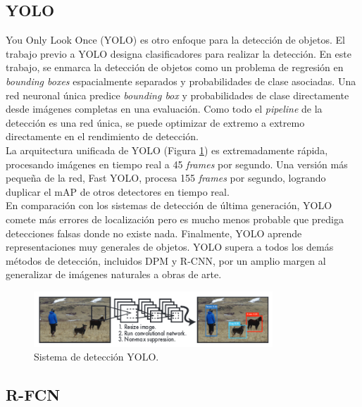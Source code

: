 \documentclass{bmvc2k}
\begin{document}
\subsection{YOLO}

You Only Look Once (YOLO) es otro enfoque para la detección de objetos. El trabajo previo a YOLO designa clasificadores para realizar la detección. En este trabajo, se enmarca la detección de objetos como un problema de regresión en \textit{bounding boxes} espacialmente separados y probabilidades de clase asociadas. Una red neuronal única predice \textit{bounding box} y probabilidades de clase directamente desde imágenes completas en una evaluación. Como todo el \textit{pipeline} de la detección es una red única, se puede optimizar de extremo a extremo directamente en el rendimiento de detección.\\

La arquitectura unificada de YOLO (Figura \ref{fig.yolo}) es extremadamente rápida, procesando imágenes en tiempo real a 45 \textit{frames} por segundo. Una versión más pequeña de la red, Fast YOLO, procesa 155 \textit{frames} por segundo, logrando duplicar el mAP de otros detectores en tiempo real.\\

En comparación con los sistemas de detección de última generación, YOLO comete más errores de localización pero es mucho menos probable que prediga detecciones falsas donde no existe nada. Finalmente, YOLO aprende representaciones muy generales de objetos. YOLO supera a todos los demás métodos de detección, incluidos DPM y R-CNN, por un amplio margen al generalizar de imágenes naturales a obras de arte.\\

\begin{figure}
\begin{center}
	\includegraphics[width=0.8\textwidth]{images/yolo.png}
   \caption{Sistema de detección YOLO.}
	\label{fig.yolo}
\end{center}
\end{figure}

\subsection{R-FCN}
\end{document}
